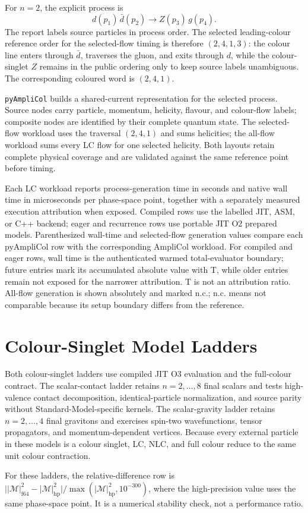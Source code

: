 \documentclass[10pt,letterpaper]{article}
\newif\ifReportLandscapePage
\newcommand{\PAC}{\texttt{pyAmpliCol}}
\newcommand{\ReportTableNote}[1]{\par\smallskip\noindent\footnotesize\textcolor{ReportMuted}{#1}\par}
\newcommand{\ReportLadderLegend}{\ReportTableNote{Each LC workload reports process-generation time in seconds and native wall time in microseconds per phase-space point, together with a separately measured execution attribution when exposed. Compiled rows use the labelled JIT, ASM, or C++ backend; eager and recurrence rows use portable JIT O2 prepared models. Parenthesized wall-time and selected-flow generation values compare each pyAmpliCol row with the corresponding AmpliCol workload. For compiled and eager rows, wall time is the authenticated warmed total-evaluator boundary; future entries mark its accumulated absolute value with T, while older entries remain not exposed for the narrower attribution. T is not an attribution ratio. All-flow generation is shown absolutely and marked n.c.; n.c. means not comparable because its setup boundary differs from the reference.}}
\newcommand{\ReportLandscapeFooter}{}
\begin{document}
\begin{landscape}
For \(n=2\), the explicit process is
\[
  d(p_1)\,\bar d(p_2)\to Z(p_3)\,g(p_4).
\]
The report labels source particles in process order. The selected leading-colour
reference order for the selected-flow timing is therefore \((2,4,1,3)\): the
colour line enters through \(\bar d\), traverses the gluon, and exits through
\(d\), while the colour-singlet \(Z\) remains in the public ordering only to
keep source labels unambiguous. The corresponding coloured word is
\((2,4,1)\).

\PAC{} builds a shared-current representation for the selected process. Source
nodes carry particle, momentum, helicity, flavour, and colour-flow labels;
composite nodes are identified by their complete quantum state. The
selected-flow workload uses the traversal \((2,4,1)\) and sums helicities; the
all-flow workload sums every LC flow for one selected helicity. Both layouts
retain complete physical coverage and are validated against the same reference
point before timing.

\clearpage

\clearpage

\ReportLadderLegend
\ReportLandscapeFooter
\end{landscape}
\ReportLandscapePagefalse
\clearpage
\pagestyle{fancy}

\section{Colour-Singlet Model Ladders}

Both colour-singlet ladders use compiled JIT O3 evaluation and the full-colour
contract. The scalar-contact ladder retains $n=2,\ldots,8$ final scalars and
tests high-valence contact decomposition, identical-particle normalization,
and source parity without Standard-Model-specific kernels. The scalar-gravity
ladder retains $n=2,\ldots,4$ final gravitons and exercises spin-two
wavefunctions, tensor propagators, and momentum-dependent vertices. Because
every external particle in these models is a colour singlet, LC, NLC, and full
colour reduce to the same unit colour contraction.

For these ladders, the relative-difference row is
\(\bigl||\mathcal M|^2_{\mathrm{f64}}-|\mathcal M|^2_{\mathrm{hp}}\bigr|
/\max(|\mathcal M|^2_{\mathrm{hp}},10^{-300})\), where the high-precision value
uses the same phase-space point. It is a numerical stability check, not a
performance ratio.



\end{document}
